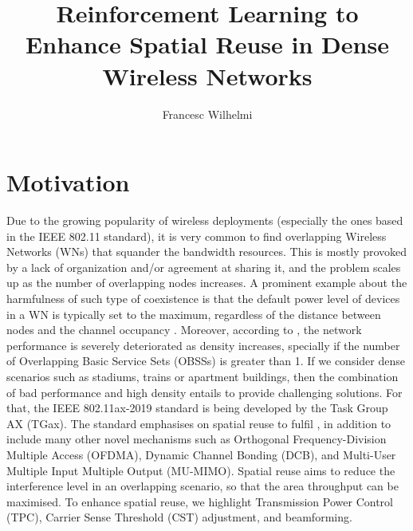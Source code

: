 \documentclass[12pt, a4paper,twoside]{tesi_upf}
\title{Reinforcement Learning to Enhance Spatial Reuse in Dense Wireless Networks}
\author{Francesc Wilhelmi}
\begin{document}
	\frontmatter
	
	\maketitle
	
	\cleardoublepage
	
	
	\mainmatter
	
	\tableofcontents
	
	\chapter{Motivation}
	\label{section:introduction}	
		Due to the growing popularity of wireless deployments (especially the ones based in the IEEE 802.11 standard), it is very common to find overlapping Wireless Networks (WNs) that squander the bandwidth resources. This is mostly provoked by a lack of organization and/or agreement at sharing it, and the problem scales up as the number of overlapping nodes increases. A prominent example about the harmfulness of such type of coexistence is that the default power level of devices in a WN is typically set to the maximum, regardless of the distance between nodes and the channel occupancy \cite{akella2007self}. Moreover, according to \cite{zhong2015issues}, the network performance is severely deteriorated as density increases, specially if the number of Overlapping Basic Service Sets (OBSSs) is greater than 1. If we consider dense scenarios such as stadiums, trains or apartment buildings, then the combination of bad performance and high density entails to provide challenging solutions. For that, the IEEE 802.11ax-2019 standard is being developed by the Task Group AX (TGax). The standard emphasises on spatial reuse to fulfil , in addition to include many other novel mechanisms such as Orthogonal Frequency-Division Multiple Access (OFDMA), Dynamic Channel Bonding (DCB), and Multi-User Multiple Input Multiple Output (MU-MIMO). Spatial reuse aims to reduce the interference level in an overlapping scenario, so that the area throughput can be maximised. To enhance spatial reuse, we highlight Transmission Power Control (TPC), Carrier Sense Threshold (CST) adjustment, and beamforming. 
		
\end{document}
